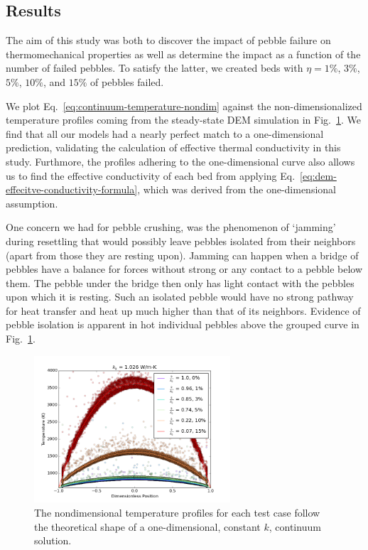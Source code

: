 \subsection{Results}
The aim of this study was both to discover the impact of pebble failure on thermomechanical properties as well as determine the impact as a function of the number of failed pebbles. To satisfy the latter, we created beds with $\eta = 1\%$, $3\%$, $5\%$, $10\%$, and $15\%$ of pebbles failed. 

We plot Eq.~\ref{eq:continuum-temperature-nondim} against the non-dimensionalized temperature profiles coming from the steady-state DEM simulation in Fig.~\ref{fig:temp-scatters}. We find that all our models had a nearly perfect match to a one-dimensional prediction, validating the calculation of effective thermal conductivity in this study. Furthmore, the profiles adhering to the one-dimensional curve also allows us to find the effective conductivity of each bed from applying Eq.~\ref{eq:dem-effecitve-conductivity-formula}, which was derived from the one-dimensional assumption.

One concern we had for pebble crushing, was the phenomenon of `jamming' during resettling that would possibly leave pebbles isolated from their neighbors (apart from those they are resting upon). Jamming can happen when a bridge of pebbles have a balance for forces without strong or any contact to a pebble below them. The pebble under the bridge then only has light contact with the pebbles upon which it is resting. Such an isolated pebble would have no strong pathway for heat transfer and heat up much higher than that of its neighbors. Evidence of pebble isolation is apparent in hot individual pebbles above the grouped curve in Fig.~\ref{fig:temp-scatters}. 

\begin{figure}[htbp]
	\centering
	\includegraphics[width=0.65\textwidth]{chapters/figures/dem-evap-0-15-scatter-keff.png}
	\caption{The nondimensional temperature profiles for each test case follow the theoretical shape of a one-dimensional, constant $k$, continuum solution.}
\label{fig:temp-scatters}
\end{figure}

